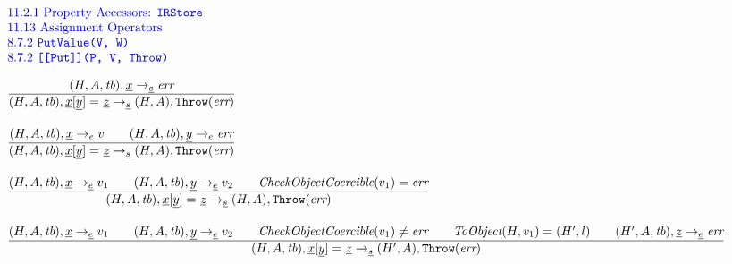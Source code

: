 \documentclass[a4paper, leqno]{amsart}
\newcommand{\rulesep}{\quad\quad}
\newcommand{\stmt}{s}
\newcommand{\expr}{e}
\newcommand{\ir}[1]{\ensuremath{\underline{#1}}}
\newcommand{\irid}{\ir{x}}
\def\inblue{\color{blue}}
\newcommand{\tb}{\emph{tb}}
\newcommand{\err}{\emph{err}}
\newcommand{\hf}[1]{\emph{#1}}
\newcommand{\error}{\ensuremath{{\tt Throw}(\err)}}
\newcommand{\state}{\ensuremath{(H,A,\tb)}}
\newcommand{\res}{\ensuremath{(H,A)}}
\newcommand{\evale}{\ensuremath{(H,A,\tb)}}
\def\inblue{\color{blue}}
\begin{document}
\[
\begin{array}{l@{~~}l@{~~}ll}
\mbox{\inblue 11.2.1 Property Accessors: {\tt IRStore}}\\
\mbox{\inblue 11.13 Assignment Operators}\\
\mbox{\inblue 8.7.2 {\tt PutValue(V, W)}}\\
\mbox{\inblue 8.7.2 {\tt [[Put]](P, V, Throw)}}\\[1em]

\frac{\begin{matrix}
\evale, \irid \rightarrow_{\ir\expr} \err
\end{matrix}}{\begin{matrix}
\state, \irid{\tt[}\ir{y}{\tt] =} \ \ir{z} \rightarrow_{\ir\stmt}
\res, \error
\end{matrix}}
\\[2em]

\frac{\begin{matrix}
\evale, \irid \rightarrow_{\ir\expr} v
\rulesep
\evale, \ir{y} \rightarrow_{\ir\expr} \err
\end{matrix}}{\begin{matrix}
\state, \irid{\tt[}\ir{y}{\tt] =} \ \ir{z} \rightarrow_{\ir\stmt}
\res, \error
\end{matrix}}
\\[2em]

\frac{\begin{matrix}
\evale, \irid \rightarrow_{\ir\expr} v_1
\rulesep
\evale, \ir{y} \rightarrow_{\ir\expr} v_2
\rulesep
\hf{CheckObjectCoercible}(v_1) = \err
\end{matrix}}{\begin{matrix}
\state, \irid{\tt[}\ir{y}{\tt] =} \ \ir{z} \rightarrow_{\ir\stmt}
\res, \error
\end{matrix}}
\\[2em]

\frac{\begin{matrix}
\evale, \irid \rightarrow_{\ir\expr} v_1
\rulesep
\evale, \ir{y} \rightarrow_{\ir\expr} v_2
\rulesep
\hf{CheckObjectCoercible}(v_1) \not= \err
\rulesep
\hf{ToObject}(H, v_1) = (H',l)
\rulesep
(H', A, \tb), \ir{z} \rightarrow_{\ir\expr} \err
\end{matrix}}{\begin{matrix}
\state, \irid{\tt[}\ir{y}{\tt] =} \ \ir{z} \rightarrow_{\ir\stmt}
(H',A), \error
\end{matrix}}
\\[2em]


\end{array}\]
\end{document}

